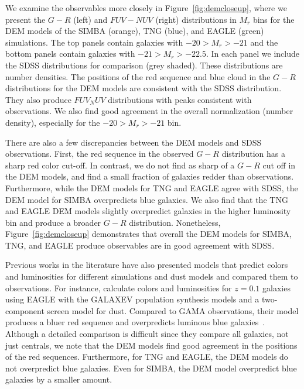 We examine the observables more closely in Figure~\ref{fig:demcloseup}, where
we present the $G-R$ (left) and $FUV-NUV$ (right) distributions in $M_r$ 
bins for the DEM models of the SIMBA (orange), TNG (blue), and EAGLE (green) 
simulations. The top panels contain galaxies with $-20 > M_r > -21$ and the 
bottom panels contain galaxies with $-21 > M_r > -22.5$. In each panel we 
include the SDSS distributions for comparison (grey shaded). These distributions are 
number densities. The positions of the red sequence and blue cloud in the $G-R$
distributions for the DEM models are consistent with the SDSS distribution. 
They also produce $FUV_NUV$ distributions with peaks consistent with
observations. We also find good agreement in the overall normalization
(number density), especially for the $-20 > M_r > -21$ bin. 

There are also a few discrepancies between the DEM models and SDSS observations. 
First, the red sequence in the observed $G-R$ distribution has a sharp red color 
cut-off.  In contrast, we do not find as sharp of a $G-R$ cut off in the DEM models, 
and find a small fraction of galaxies redder than observations. 
Furthermore, while the DEM models for TNG and EAGLE agree with SDSS, the DEM
model for SIMBA overpredicts blue galaxies.  We also find that the TNG and EAGLE DEM models slightly overpredict 
galaxies in the higher luminosity bin and produce a broader $G-R$ distribution.
Nonetheless, Figure~\ref{fig:demcloseup} demonstrates that overall the DEM
models for SIMBA, TNG, and EAGLE produce observables are in good agreement 
with SDSS.

Previous works in the literature have also presented models that predict colors
and luminosities for different simulations and dust models and compared them to
observations. For instance, \cite{trayford2015} calculate colors and luminosities 
for $z=0.1$ galaxies using EAGLE with the {\sc GALAXEV} population synthesis models 
and a two-component screen model for dust. Compared to GAMA observations, their
model produces a bluer red sequence and overpredicts luminous blue galaxies~\citep[][Figure
5]{trayford2015}. Although a detailed comparison is difficult since they
compare all galaxies, not just centrals, we note that the DEM models find good
agreement in the positions of the red sequences. Furthermore, for TNG and EAGLE, 
the DEM models do not overpredict blue galaxies. Even for SIMBA, the DEM model
overpredict blue galaxies by a smaller amount.

